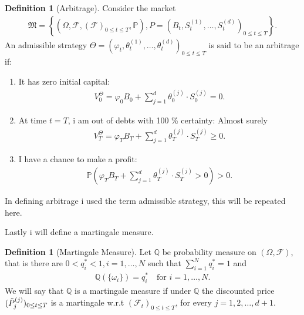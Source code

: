 \documentclass{article}
\theoremstyle{definition}
\newtheorem{definition}[theorem]{Definition}
\numberwithin{equation}{section}
\begin{document}
\begin{definition}[Arbitrage]
    Consider the market
    \begin{align}
        \mathfrak{M} =
        \left\{
            \left(
                \Omega, 
                \mathscr{F}, 
                \left(
                    \mathscr{F}
                \right)_{0 \leq t \leq T},
                \mathbb{P}
            \right),
            P =
            \left(
                B_t,
                S_t^{(1)},
                \ldots,
                S_t^{(d)}
            \right)_{0 \leq t \leq T}
        \right\}.
    \end{align}
    An admissible strategy $\Theta = \left(\varphi_t, \theta_t^{(1)}, \ldots, \theta_t^{(d)}\right)_{0 \leq t \leq T}$ is said to be an arbitrage if:
    \begin{enumerate}
        \item It has zero initial capital:
        \begin{align}
            V_0^\Theta = \varphi_0B_0 + \sum_{j = 1}^d\theta_0^{(j)} \cdot S_0^{(j)} = 0.
        \end{align}
        \item At time $t = T$, i am out of debts with 100 \% certainty: Almost surely
        \begin{align}
            V_T^\Theta = \varphi_T B_T + \sum_{j = 1}^d\theta_T^{(j)} \cdot S_T^{(j)} \geq 0.
        \end{align}
        \item I have a chance to make a profit:
        \begin{align}
            \mathbb{P}
            \left(
                \varphi_TB_T + \sum_{j = 1}^d \theta_T^{(j)} \cdot S_T^{(j)} > 0
            \right) > 0.
        \end{align}
    \end{enumerate}
\end{definition}
In defining arbitrage i used the term admissible strategy, this will be repeated here.

Lastly i will define a martingale measure.
\begin{definition}[Martingale Measure]
    Let $\mathbb{Q}$ be probability measure on $(\Omega, \mathscr{F})$, that is there are $0 < q^*_i < 1, i = 1, \ldots, N$ such that $\sum_{i=1}^N q^*_i = 1$ and 
    \begin{align}
        \mathbb{Q}(\{ \omega_i \}) = q^*_i \quad \text{for } i = 1, \ldots, N. 
    \end{align}
    We will say that $\mathbb{Q}$ is a martingale measure if under $\mathbb{Q}$ the discounted price $(\Tilde{P}_j^{(j)})_{0 \leq t \leq T}$ is a martingale w.r.t $(\mathscr{F}_t)_{0 \leq t \leq T}$, for every $j = 1,2, \ldots, d+1$.
\end{definition}
\end{document}
